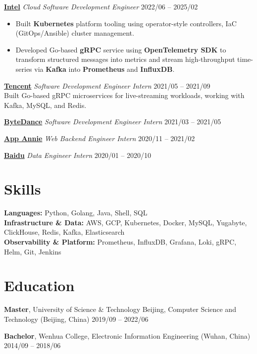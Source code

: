 \documentclass[11pt,a4paper]{article}
\newcommand{\company}[1]{{\large\textcolor{CompanyColor}{\textbf{#1}}}}
\begin{document}
\vspace{5pt}

\noindent
\href{https://www.intel.com}{\company{Intel}} \hfill \textit{Cloud Software Development Engineer} \hfill 2022/06 -- 2025/02

\vspace{2pt}
\begin{itemize}
  \item Built \textbf{Kubernetes} platform tooling using operator-style controllers, IaC (GitOps/Ansible) cluster management.
  \item Developed Go-based \textbf{gRPC} service using \textbf{OpenTelemetry SDK} to transform structured messages into metrics and stream high-throughput time-series via \textbf{Kafka} into \textbf{Prometheus} and \textbf{InfluxDB}.
\end{itemize}

\vspace{4pt}

\noindent
\href{https://www.tencent.com}{\company{Tencent}} \hfill \textit{Software Development Engineer Intern} \hfill 2021/05 -- 2021/09 \\
Built Go-based gRPC microservices for live-streaming workloads, working with Kafka, MySQL, and Redis.

\vspace{2pt}
\noindent
\href{https://www.bytedance.com}{\company{ByteDance}} \hfill \textit{Software Development Engineer Intern} \hfill 2021/03 -- 2021/05

\vspace{1pt}
\noindent
\href{https://www.data.ai}{\company{App Annie}} \hfill \textit{Web Backend Engineer Intern} \hfill 2020/11 -- 2021/02

\vspace{0pt}
\noindent
\href{https://www.baidu.com}{\company{Baidu}} \hfill \textit{Data Engineer Intern} \hfill 2020/01 -- 2020/10

\section*{Skills}
\textbf{Languages:} Python, Golang, Java, Shell, SQL \\
\textbf{Infrastructure \& Data:} AWS, GCP, Kubernetes, Docker, MySQL, Yugabyte, ClickHouse, Redis, Kafka, Elasticsearch \\
\textbf{Observability \& Platform:} Prometheus, InfluxDB, Grafana, Loki, gRPC, Helm, Git, Jenkins

\section*{Education}
\textbf{Master}, {\small University of Science \& Technology Beijing, Computer Science and Technology (Beijing, China)} \hfill {\small 2019/09 -- 2022/06}

\vspace{4pt}
\noindent
\textbf{Bachelor}, {\small Wenhua College, Electronic Information Engineering (Wuhan, China)} \hfill {\small 2014/09 -- 2018/06}
\end{document}
